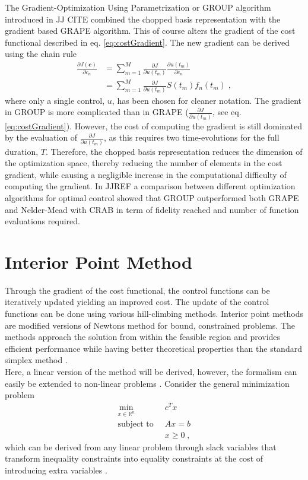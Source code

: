 The Gradient-Optimization Using Parametrization or \textsc{GROUP} algorithm introduced in JJ CITE combined the chopped basis representation with the gradient based \textsc{GRAPE} algorithm. This of course alters the gradient of the cost functional described in eq. \eqref{eq:costGradient}. The new gradient can be derived using the chain rule
\begin{align}
	\frac{\partial J (\boldsymbol{c})}{\partial c_n} &= \sum_{m = 1}^{M} \frac{\partial J }{\partial u(t_m)} \frac{\partial u(t_m)}{\partial c_n} \nonumber \\
	&= \sum_{m = 1}^{M} \frac{\partial J }{\partial u(t_m)} S(t_m) f_n(t_m) \; , \label{eq:GROUPgradient} 
\end{align}
where only a single control, $u$, has been chosen for cleaner notation. The gradient in \textsc{GROUP} is more complicated than in \textsc{GRAPE} ($\frac{\partial J }{\partial u(t_m)}$, see eq. \eqref{eq:costGradient}). However, the cost of computing the gradient is still dominated by the evaluation of $\frac{\partial J }{\partial u(t_m)}$, as this requires two time-evolutions for the full duration, $T$. Therefore, the chopped basis representation reduces the dimension of the optimization space, thereby reducing the number of elements in the cost gradient, while causing a negligible increase in the computational difficulty of computing the gradient.
In JJREF a comparison between different optimization algorithms for optimal control showed that \textsc{GROUP} outperformed both \textsc{GRAPE} and Nelder-Mead with \textsc{CRAB} in term of fidelity reached and number of function evaluations required.


\section{Interior Point Method}
Through the gradient of the cost functional, the control functions can be iteratively updated yielding an improved cost. The update of the control functions can be done using various hill-climbing methods.
Interior point methods are modified versions of Newtons method for bound, constrained problems. The methods approach the solution from within the feasible region and provides efficient performance while having better theoretical properties than the standard simplex method \cite{wright}.\\

Here, a linear version of the method will be derived, however, the formalism can easily be extended to non-linear problems \cite{wright}.
Consider the general minimization problem
 \begin{align*}
	\min_{x \in \mathbb{R}^n} \;  & \; c^T x \\
	\text{subject to} \;  & \; A x = b  \\
							& \; x \geq 0 \; ,
\end{align*}
which can be derived from any linear problem through slack variables that transform inequality constraints into equality constraints at the cost of introducing extra variables \cite{ipopt}.

